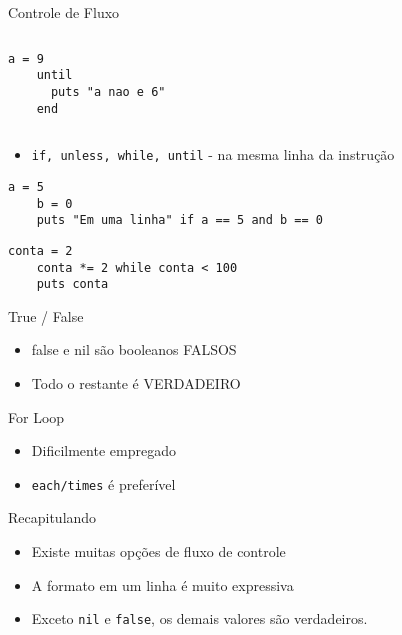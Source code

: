 \begin{frame}{Controle de Fluxo}
\begin{columns}
\begin{column}{0.5\textwidth}
      \begin{lstlisting}[style=RubyInputStyle, caption=until.rb]
    a = 9
    until
      puts "a nao e 6"
    end 
      \end{lstlisting}
    \end{column}
  \end{columns}
\pagebreak
  \begin{itemize}
    \item \verb!if, unless, while, until! - na mesma linha da instrução
  \end{itemize}   
      \begin{lstlisting}[style=RubyInputStyle, caption=if\_uma\_linha.rb]
    a = 5
    b = 0
    puts "Em uma linha" if a == 5 and b == 0
      \end{lstlisting}  
      \begin{lstlisting}[style=RubyInputStyle, caption=while\_uma\_linha.rb]
    conta = 2 
    conta *= 2 while conta < 100
    puts conta
      \end{lstlisting}
\end{frame}

\begin{frame}[fragile,t]{True / False}
  \begin{itemize}
    \item false e nil são booleanos FALSOS
    \item Todo o restante é VERDADEIRO
	
  \end{itemize}   
\end{frame}

\begin{frame}{For Loop}
  \begin{itemize}
    \item Dificilmente empregado
    \item \verb!each/times! é preferível
  \end{itemize}
  
  

\end{frame}


\begin{frame}[fragile,t]{Recapitulando}
  \begin{itemize}
    \item Existe muitas opções de fluxo de controle
    \item A formato em um linha é muito expressiva
    \item Exceto \verb!nil! e \verb!false!, os demais valores são verdadeiros.
  \end{itemize}
\end{frame}



